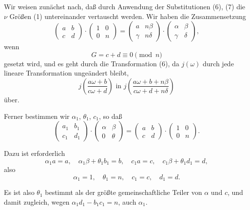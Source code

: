 \documentclass[12pt,a4paper]{article}
\theoremstyle{definition}
\begin{document}
Wir weisen zunächst nach, daß durch Anwendung der Substitutionen (6), (7) die $\nu$ Größen (1) untereinander vertauscht werden. Wir haben die Zusammensetzung
\begin{equation}\label{eq:69-8}
\begin{pmatrix} a & b \\ c & d \end{pmatrix} \cdot \begin{pmatrix} 1 & 0 \\ 0 & n \end{pmatrix} = \begin{pmatrix} a & n\beta \\ \gamma & n\delta \end{pmatrix} \cdot \begin{pmatrix} \alpha & \beta \\ \gamma & \delta \end{pmatrix},
\end{equation}
wenn
\begin{equation}\label{eq:69-9}
G = c + d \equiv 0 \pmod{n}
\end{equation}
gesetzt wird, und es geht durch die Transformation (6), da $j(\omega)$ durch jede lineare Transformation ungeändert bleibt,
\[
j\left(\frac{a\omega + b}{c\omega + d}\right) \text{ in } j\left(\frac{a\omega + b + n\beta}{c\omega + d + n\delta}\right)
\]
über.

Ferner bestimmen wir $\alpha_1$, $\theta_1$, $c_1$, so daß
\[
\begin{pmatrix} a_1 & b_1 \\ c_1 & d_1 \end{pmatrix} \cdot \begin{pmatrix} \alpha & \beta \\ 0 & \theta \end{pmatrix} = \begin{pmatrix} a & b \\ c & d \end{pmatrix} \cdot \begin{pmatrix} 1 & 0 \\ 0 & n \end{pmatrix}.
\]

Dazu ist erforderlich
\[
\alpha_1 a = a, \quad \alpha_1 \beta + \theta_1 b_1 = b, \quad c_1 a = c, \quad c_1 \beta + \theta_1 d_1 = d,
\]
also
\[
\alpha_1 = 1, \quad \theta_1 = n, \quad c_1 = c, \quad d_1 = d.
\]

Es ist also $\theta_1$ bestimmt als der größte gemeinschaftliche Teiler von $\alpha$ und $c$, und damit zugleich, wegen $\alpha_1 d_1 - b_1 c_1 = n$, auch $\alpha_1$.
\end{document}
